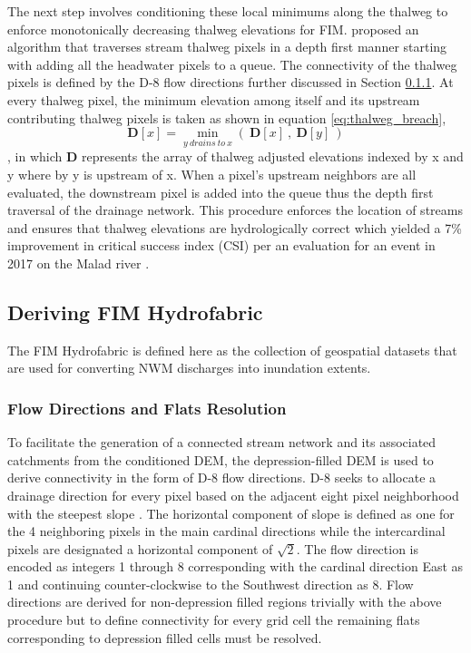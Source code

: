 The next step involves conditioning these local minimums along the thalweg to enforce monotonically decreasing thalweg elevations for FIM.
 proposed an algorithm that traverses stream thalweg pixels in a depth first manner starting with adding all the headwater pixels to a queue. 
The connectivity of the thalweg pixels is defined by the D-8 flow directions further discussed in Section \ref{ssec:flow_direction_and_flat_resolution}.
At every thalweg pixel, the minimum elevation among itself and its upstream contributing thalweg pixels is taken as shown in equation \ref{eq:thalweg_breach},
%
\begin{equation}
\label{eq:thalweg_breach}
\textbf{D}[x] = \min_{y\ drains\ to\ x} {(\ \textbf{D}[x]\ ,\ \textbf{D}[y]\ )}
\end{equation}
%
, in which \textbf{D} represents the array of thalweg adjusted elevations indexed by x and y where by y is upstream of x. 
When a pixel's upstream neighbors are all evaluated, the downstream pixel is added into the queue thus the depth first traversal of the drainage network.
This procedure enforces the location of streams and ensures that thalweg elevations are hydrologically correct which yielded a 7\% improvement in critical success index (CSI) per an evaluation for an event in 2017 on the Malad river \cite{garousi2019terrain}.
%
\subsection{Deriving FIM Hydrofabric}
\label{ssec:deriving_fim_hydrofabric}
%
The FIM Hydrofabric is defined here as the collection of geospatial datasets that are used for converting NWM discharges into inundation extents.
%
\subsubsection{Flow Directions and Flats Resolution}
\label{ssec:flow_direction_and_flat_resolution}
%
To facilitate the generation of a connected stream network and its associated catchments from the conditioned DEM, the depression-filled DEM is used to derive connectivity in the form of D-8 flow directions.
D-8 seeks to allocate a drainage direction for every pixel based on the adjacent eight pixel neighborhood with the steepest slope \cite{o1984extraction}.
The horizontal component of slope is defined as one for the 4 neighboring pixels in the main cardinal directions while the intercardinal pixels are designated a horizontal component of $\sqrt{2}$. 
The flow direction is encoded as integers 1 through 8 corresponding with the cardinal direction East as 1 and continuing counter-clockwise to the Southwest direction as 8. 
Flow directions are derived for non-depression filled regions trivially with the above procedure but to define connectivity for every grid cell the remaining flats corresponding to depression filled cells must be resolved.

